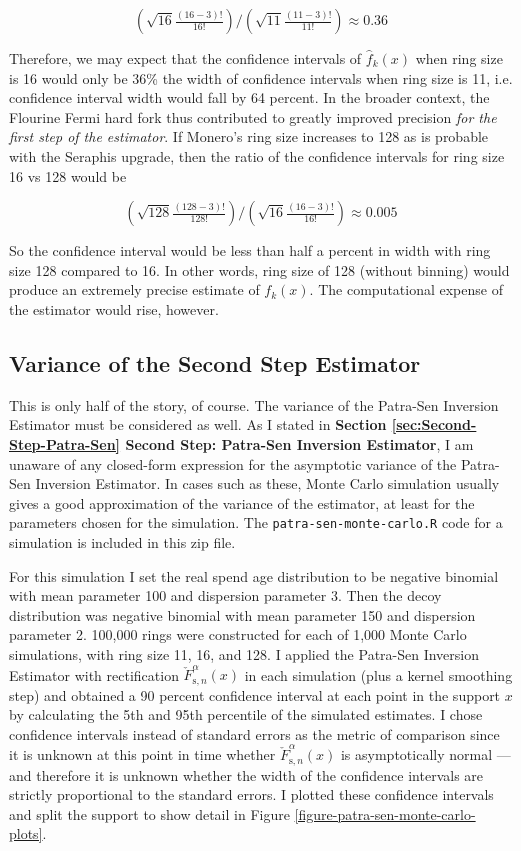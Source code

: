 \documentclass[english]{article}
\begin{document}
\[
\left(\sqrt{16}\tfrac{(16-3)!}{16!}\right)/\left(\sqrt{11}\tfrac{(11-3)!}{11!}\right)\approx0.36
\]

Therefore, we may expect that the confidence intervals of $\hat{f}_{k}(x)$
when ring size is 16 would only be 36\% the width of confidence intervals
when ring size is 11, i.e. confidence interval width would fall by
64 percent. In the broader context, the Flourine Fermi hard fork thus
contributed to greatly improved precision \textit{for the first step
of the estimator}. If Monero's ring size increases to 128 as is probable
with the Seraphis upgrade, then the ratio of the confidence intervals
for ring size 16 vs 128 would be

\[
\left(\sqrt{128}\tfrac{(128-3)!}{128!}\right)/\left(\sqrt{16}\tfrac{(16-3)!}{16!}\right)\approx0.005
\]

So the confidence interval would be less than half a percent in width
with ring size 128 compared to 16. In other words, ring size of 128
(without binning) would produce an extremely precise estimate of $f_{k}(x)$.
The computational expense of the estimator would rise, however.

\subsection{Variance of the Second Step Estimator\label{subsec:Variance-of-the-Second-Step-Estimator}}

This is only half of the story, of course. The variance of the Patra-Sen
Inversion Estimator must be considered as well. As I stated in \textbf{Section
\ref{sec:Second-Step-Patra-Sen} Second Step: Patra-Sen Inversion
Estimator}, I am unaware of any closed-form expression for the asymptotic
variance of the Patra-Sen Inversion Estimator. In cases such as these,
Monte Carlo simulation usually gives a good approximation of the variance
of the estimator, at least for the parameters chosen for the simulation.
The \texttt{patra-sen-monte-carlo.R} code for a simulation is included
in this zip file.

For this simulation I set the real spend age distribution to be negative
binomial with mean parameter 100 and dispersion parameter 3. Then
the decoy distribution was negative binomial with mean parameter 150
and dispersion parameter 2. 100,000 rings were constructed for each
of 1,000 Monte Carlo simulations, with ring size 11, 16, and 128.
I applied the Patra-Sen Inversion Estimator with rectification $\check{F}_{\mathrm{s},n}^{\alpha}(x)$
in each simulation (plus a kernel smoothing step) and obtained a 90
percent confidence interval at each point in the support $x$ by calculating
the 5th and 95th percentile of the simulated estimates. I chose confidence
intervals instead of standard errors as the metric of comparison since
it is unknown at this point in time whether $\check{F}_{\mathrm{s},n}^{\alpha}(x)$
is asymptotically normal --- and therefore it is unknown whether
the width of the confidence intervals are strictly proportional to
the standard errors. I plotted these confidence intervals and split
the support to show detail in Figure \ref{figure-patra-sen-monte-carlo-plots}.
\end{document}
